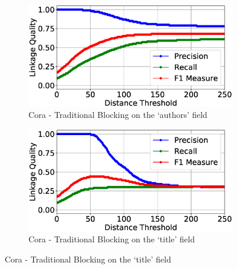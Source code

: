 \documentclass{llncs}
\begin{document}
\begin{figure}
\begin{subfigure}{.5\textwidth}
  \centering
\includegraphics[width=\textwidth]{figures/plotLQ-cora-trad-authors}
\caption{Cora - Traditional Blocking on the `authors' field}
\end{subfigure}%
\begin{subfigure}{.5\textwidth}
  \centering
\includegraphics[width=\textwidth]{figures/plotLQ-cora-trad-title}
\caption{Cora - Traditional Blocking on the `title' field}
\end{subfigure}


\end{figure}
\end{document}
